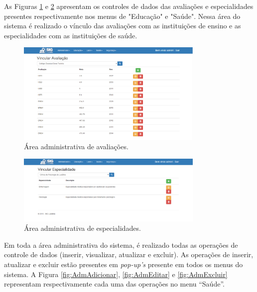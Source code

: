 \newpage

As Figuras \ref{fig:AdmAvaliacao} e \ref{fig:AdmEspecialidade} apresentam os controles de dados das avaliações e especialidades presentes respectivamente nos menus de "Educação" e "Saúde". Nessa área do sistema é realizado o vínculo das avaliações com as instituições de ensino e as especialidades com as instituições de saúde.

\begin{figure}[h]
\centering
\includegraphics[width=0.80\textwidth]{./img/cap_IV/23-AdmAvaliacao}
\caption{Área administrativa de avaliações.}
\label{fig:AdmAvaliacao}
\end{figure}

\newpage

\begin{figure}[h]
\centering
\includegraphics[width=0.80\textwidth]{./img/cap_IV/24-AdmEspecialidade}
\caption{Área administrativa de especialidades.}
\label{fig:AdmEspecialidade}
\end{figure}

Em toda a área administrativa do sistema, é realizado todas as operações de controle de dados (inserir, visualizar, atualizar e excluir). As operações de inserir, atualizar e excluir estão presentes em \textit{pop-up’s} presente em todos os menus do sistema. A Figura \ref{fig:AdmAdicionar}, \ref{fig:AdmEditar} e \ref{fig:AdmExcluir} representam respectivamente cada uma das operações no menu “Saúde”.

